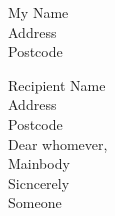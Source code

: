 \documentclass[a4paper,12pt]{article}
\begin{document}
\begin{flushright}
	{\large
	My Name\\
	Address\\
	Postcode\\
	}
\end{flushright}
\vspace{1cm}
\begin{flushleft}
	{\large
	Recipient Name\\
	Address\\
	Postcode\\
	}
\vspace{1cm}
Dear whomever,\\
\vspace{0.5cm}
Mainbody
\vspace{0.5cm}\\
Sicncerely\\
\vspace{0.5cm}
Someone
\end{flushleft}
\end{document}
